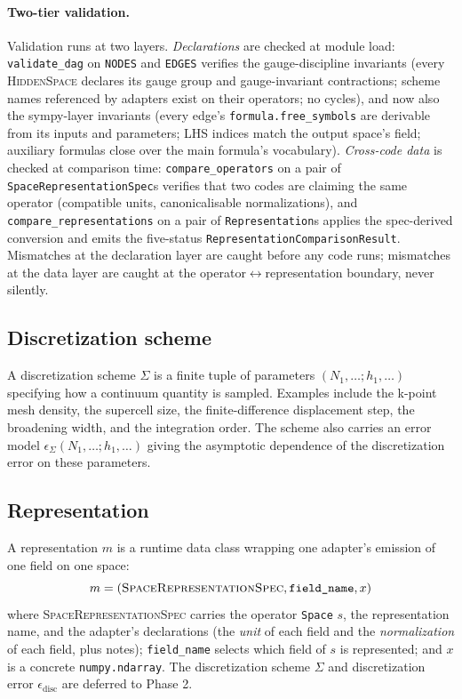 \documentclass[11pt,a4paper]{article}
\begin{document}
\paragraph{Two-tier validation.} Validation runs at two layers.
\emph{Declarations} are checked at module load: \texttt{validate\_dag} on
\texttt{NODES} and \texttt{EDGES} verifies the gauge-discipline invariants
(every \textsc{HiddenSpace} declares its gauge group and gauge-invariant
contractions; scheme names referenced by adapters exist on their
operators; no cycles), and now also the sympy-layer invariants (every
edge's \texttt{formula.free\_symbols} are derivable from its inputs and
parameters; LHS indices match the output space's field; auxiliary
formulas close over the main formula's vocabulary). \emph{Cross-code
data} is checked at comparison time: \texttt{compare\_operators} on a
pair of \texttt{SpaceRepresentationSpec}s verifies that two codes are claiming
the same operator (compatible units, canonicalisable normalizations), and
\texttt{compare\_representations} on a pair of \texttt{Representation}s
applies the spec-derived conversion and emits the five-status
\texttt{RepresentationComparisonResult}. Mismatches at the declaration
layer are caught before any code runs; mismatches at the data layer are
caught at the operator$\leftrightarrow$representation boundary, never
silently.

\subsection{Discretization scheme}

A discretization scheme $\Sigma$ is a finite tuple of parameters $(N_1, \ldots; h_1, \ldots)$
specifying how a continuum quantity is sampled. Examples include the k-point mesh density, the
supercell size, the finite-difference displacement step, the broadening width, and the integration
order. The scheme also carries an error model $\epsilon_{\Sigma}(N_1, \ldots; h_1, \ldots)$
giving the asymptotic dependence of the discretization error on these parameters.

\subsection{Representation}

A representation $m$ is a runtime data class wrapping one adapter's emission of one
field on one space:
\begin{equation*}
  m = (\textsc{SpaceRepresentationSpec}, \texttt{field\_name}, x)
\end{equation*}
where \textsc{SpaceRepresentationSpec} carries the operator \texttt{Space} $s$, the
representation name, and the adapter's declarations (the \emph{unit} of each
field and the \emph{normalization} of each field, plus notes);
\texttt{field\_name} selects which field of $s$ is represented; and $x$ is a concrete
\texttt{numpy.ndarray}. The discretization scheme $\Sigma$ and discretization error
$\epsilon_{\text{disc}}$ are deferred to Phase 2.
\end{document}
